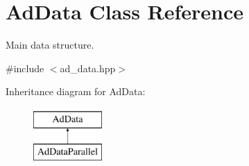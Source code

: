 \hypertarget{classAdData}{\section{\-Ad\-Data \-Class \-Reference}
\label{classAdData}
}


\-Main data structure.  




{\ttfamily \#include $<$ad\-\_\-data.\-hpp$>$}

\-Inheritance diagram for \-Ad\-Data\-:\begin{figure}[H]
\begin{center}
\leavevmode
\includegraphics[height=2.000000cm]{classAdData}
\end{center}
\end{figure}
